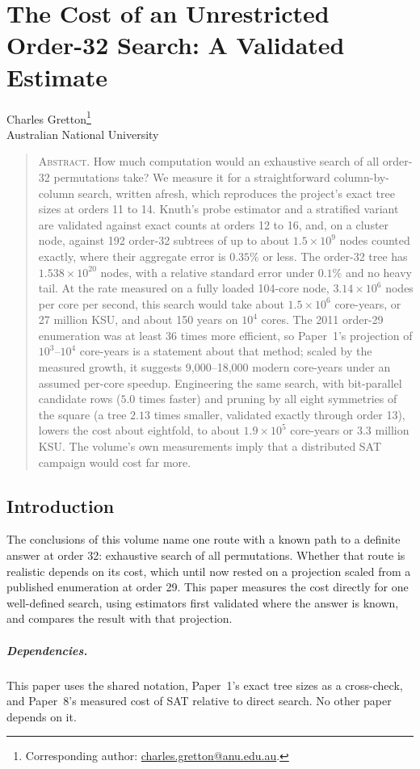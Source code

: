 \documentclass[11pt,a4paper,oneside]{report}
\makeatletter
\theoremstyle{definition}
\newcommand{\paperauthor}{\begin{center}\large Charles Gretton\footnote{Corresponding author: \href{mailto:charles.gretton@anu.edu.au}{charles.gretton@anu.edu.au}.}\\[2pt]\normalsize Australian National University\end{center}\vspace{0.5em}}
\newcommand{\paperabstract}[1]{\begin{quote}\small\noindent\textsc{Abstract.} #1\end{quote}\vspace{0.5em}}
\makeatother
\begin{document}
\clearpage
\chapter{The Cost of an Unrestricted Order-32 Search: A Validated Estimate}\label{p9-paper}
\paperauthor
\paperabstract{How much computation would an exhaustive search of all order-32 permutations take? We measure
it for a straightforward column-by-column search, written afresh, which reproduces the project's exact
tree sizes at orders 11 to 14. Knuth's probe estimator and a stratified variant are validated against
exact counts at orders 12 to 16, and, on a cluster node, against 192 order-32 subtrees of up to about
$1.5\times10^9$ nodes counted exactly, where their aggregate error is $0.35\%$ or less. The order-32 tree
has $1.538\times10^{20}$ nodes, with a relative standard error under $0.1\%$ and no heavy tail. At the rate
measured on a fully loaded 104-core node, $3.14\times10^6$ nodes per core per second, this search would
take about $1.5\times10^6$ core-years, or 27 million KSU, and about 150 years on $10^4$ cores. The 2011
order-29 enumeration was at least 36 times more efficient, so Paper~1's projection of $10^3$--$10^4$
core-years is a statement about that method; scaled by the measured growth, it suggests
9{,}000--18{,}000 modern core-years under an assumed per-core speedup. Engineering the same search, with bit-parallel candidate rows ($5.0$ times faster) and pruning by all
eight symmetries of the square (a tree $2.13$ times smaller, validated exactly through order 13), lowers the
cost about eightfold, to about $1.9\times10^5$ core-years or 3.3 million KSU. The volume's own measurements
imply that a distributed SAT campaign would cost far more.}

\section{Introduction}\label{p9-sec:paperintro}
The conclusions of this volume name one route with a known path to a definite answer at order 32:
exhaustive search of all permutations. Whether that route is realistic depends on its cost, which until
now rested on a projection scaled from a published enumeration at order 29. This paper measures the cost
directly for one well-defined search, using estimators first validated where the answer is known, and
compares the result with that projection.

\paragraph{Dependencies.} This paper uses the shared notation, Paper~1's exact tree sizes as a cross-check,
and Paper~8's measured cost of SAT relative to direct search. No other paper depends on it.
\end{document}
